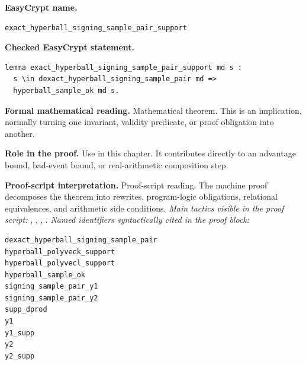 \begin{formaltheorem}
\noindent\textbf{EasyCrypt name.}
\begin{lstlisting}[language=EasyCrypt,basicstyle=\ttfamily\scriptsize]
exact_hyperball_signing_sample_pair_support
\end{lstlisting}
\noindent\textbf{Checked EasyCrypt statement.}
\begin{lstlisting}[language=EasyCrypt,basicstyle=\ttfamily\scriptsize]
lemma exact_hyperball_signing_sample_pair_support md s :
  s \in dexact_hyperball_signing_sample_pair md =>
  hyperball_sample_ok md s.
\end{lstlisting}
\noindent\textbf{Formal mathematical reading.}
Mathematical theorem. This is an implication, normally turning one invariant, validity predicate, or proof obligation into another.

\noindent\textbf{Role in the proof.}
Use in this chapter. It contributes directly to an advantage bound, bad-event bound, or real-arithmetic composition step.

\noindent\textbf{Proof-script interpretation.}
Proof-script reading. The machine proof decomposes the theorem into rewrites, program-logic obligations, relational equivalences, and arithmetic side conditions.
\emph{Main tactics visible in the proof script:} , , , .
\emph{Named identifiers syntactically cited in the proof block:}
\begin{lstlisting}[language=EasyCrypt,basicstyle=\ttfamily\scriptsize]
dexact_hyperball_signing_sample_pair
hyperball_polyveck_support
hyperball_polyvecl_support
hyperball_sample_ok
signing_sample_pair_y1
signing_sample_pair_y2
supp_dprod
y1
y1_supp
y2
y2_supp
\end{lstlisting}

\end{formaltheorem}

